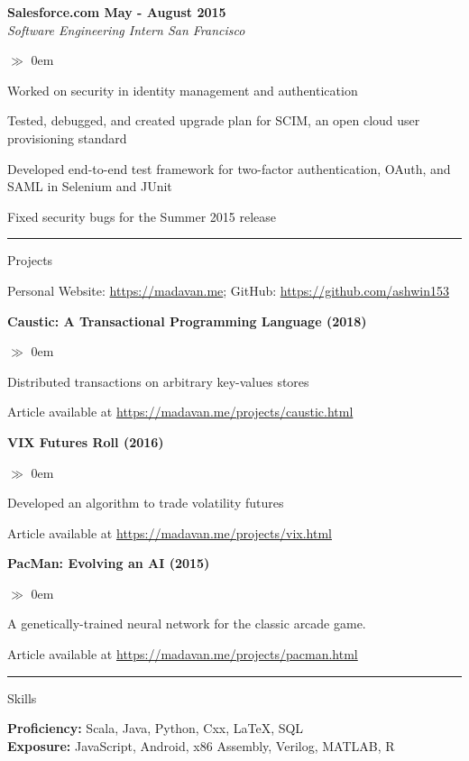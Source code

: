 \documentclass{article}
\begin{document}
\noindent\textbf{Salesforce.com \hfill{May - August 2015}}\\
\noindent\emph{Software Engineering Intern \hfill{San Francisco}}
\begin{list}{$\gg$}{}  
  \itemsep0em
  \item Worked on security in identity management and authentication
  \item Tested, debugged, and created upgrade plan for SCIM, an open cloud user provisioning standard
  \item Developed end-to-end test framework for two-factor authentication,
  OAuth, and SAML in Selenium and JUnit
  \item Fixed security bugs for the Summer 2015 release
\end{list}

\hrule\medskip
\centerline{\large \sc Projects}\smallskip 
\centerline{Personal Website: \url{https://madavan.me}; GitHub:
\url{https://github.com/ashwin153}}\medskip

\noindent\textbf{Caustic: A Transactional Programming Language (2018)}
\begin{list}{$\gg$}{}
  \itemsep0em
  \item Distributed transactions on arbitrary key-values stores
  \item Article available at \url{https://madavan.me/projects/caustic.html}
\end{list}

\noindent\textbf{VIX Futures Roll (2016)}
\begin{list}{$\gg$}{}
  \itemsep0em
  \item Developed an algorithm to trade volatility futures
  \item Article available at \url{https://madavan.me/projects/vix.html}
\end{list}

\noindent\textbf{PacMan: Evolving an AI (2015)}
\begin{list}{$\gg$}{}  
  	\itemsep0em
	\item A genetically-trained neural network for the classic arcade game.
	\item Article available at \url{https://madavan.me/projects/pacman.html}
\end{list}

\hrule\medskip
\centerline{\large\sc Skills}\smallskip
\noindent\textbf{Proficiency:} Scala, Java, Python, Cxx, \LaTeX, SQL \\
\noindent\textbf{Exposure:} JavaScript, Android, x86 Assembly, Verilog, MATLAB, R \\
\end{document}
